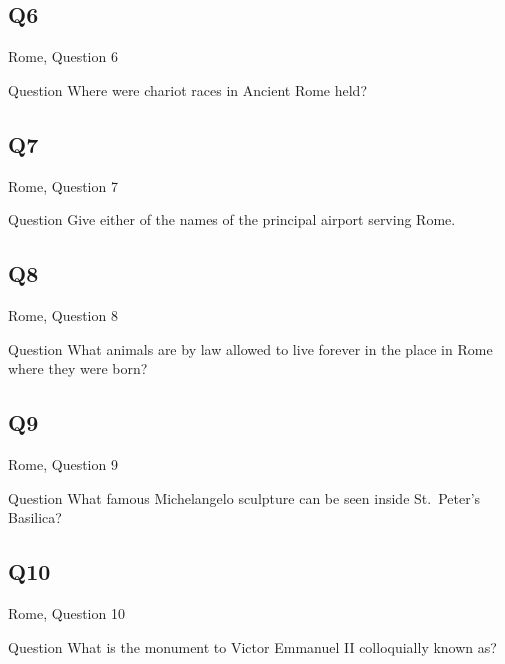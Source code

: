 \documentclass[11pt]{beamer}
\begin{document}
\subsection*{Q6}
\begin{frame}[t]{Rome, Question 6}
\begin{block}{Question}
Where were chariot races in Ancient Rome held?
\end{block}
\end{frame}
\subsection*{Q7}
\begin{frame}[t]{Rome, Question 7}
\begin{block}{Question}
Give either of the names of the principal airport serving Rome.
\end{block}
\end{frame}
\subsection*{Q8}
\begin{frame}[t]{Rome, Question 8}
\begin{block}{Question}
What animals are by law allowed to live forever in the place in Rome where they were born?
\end{block}
\end{frame}
\subsection*{Q9}
\begin{frame}[t]{Rome, Question 9}
\begin{block}{Question}
What famous Michelangelo sculpture can be seen inside St.\ Peter's Basilica?  
\end{block}
\end{frame}
\subsection*{Q10}
\begin{frame}[t]{Rome, Question 10}
\begin{block}{Question}
What is the monument to Victor Emmanuel II colloquially known as?
\end{block}
\end{frame}
\end{document}
